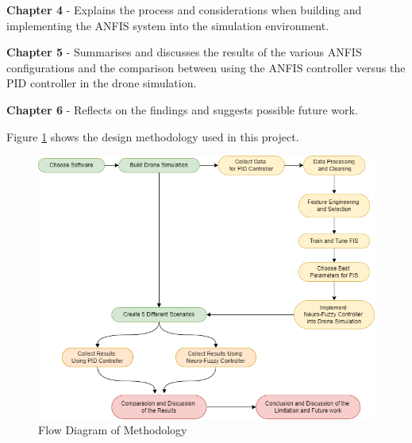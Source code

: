 \textbf{Chapter 4} - Explains the process and considerations when building and implementing the ANFIS system into the simulation environment. 

\textbf{Chapter 5} - Summarises and discusses the results of the various ANFIS configurations and the comparison between using the ANFIS controller versus the PID controller in the drone simulation. 

\textbf{Chapter 6} - Reflects on the findings and suggests possible future work.

Figure \ref{fig:generalFlow} shows the design methodology used in this project. 
\begin{figure}[H]
    \centering
    \includegraphics[width = 0.8 \textwidth]{img/generalflow.drawio.png}
    \caption{Flow Diagram of Methodology}
    \label{fig:generalFlow}
\end{figure}